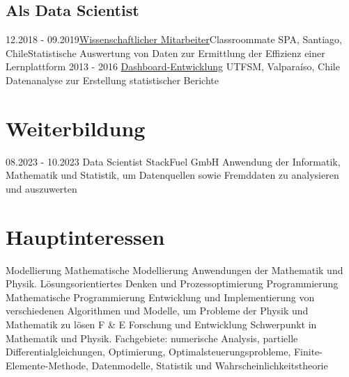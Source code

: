 \documentclass[a4paper]{cv-class}
\begin{document}
\subsection{Als Data Scientist}
\begin{entrylist}
 \entry
{12.2018 - 09.2019}{\href{https://github.com/JuanCaChavaMor/CV/blob/main/Recommendation_Letter_Classroommate.pdf}{Wissenschaftlicher Mitarbeiter}}{Classroommate SPA, Santiago, Chile}{Statistische Auswertung von Daten zur Ermittlung der Effizienz einer Lernplattform}
\entry
    {2013 - 2016}
    {\href{https://github.com/JuanCaChavaMor/CV/blob/main/Recommendation_Letter_UTFSM.pdf}{Dashboard-Entwicklung}}
    {UTFSM, Valparaíso, Chile}
    {Datenanalyse zur Erstellung statistischer Berichte}
\end{entrylist}%
\section{Weiterbildung}
\begin{entrylist}
\entry
{08.2023 - 10.2023}
{Data Scientist}
{StackFuel GmbH}
{Anwendung der Informatik, Mathematik und Statistik, um Datenquellen sowie Fremddaten zu analysieren und auszuwerten}
\end{entrylist}
\newpage
\section{Hauptinteressen}
\begin{entrylist}
\entry
    {Modellierung}
    {Mathematische Modellierung}
    {}
    {Anwendungen der Mathematik und Physik. Lösungsorientiertes Denken und Prozessoptimierung}
\entry
    {Programmierung}
    {\,Mathematische Programmierung}
    {}
    {Entwicklung und Implementierung von verschiedenen Algorithmen und Modelle, um Probleme der Physik und Mathematik zu lösen }
\entry
    {F \& E}
    {Forschung und Entwicklung}
    {}
    {Schwerpunkt in Mathematik und Physik. Fachgebiete: numerische Analysis, partielle Differentialgleichungen, Optimierung, Optimalsteuerungsprobleme, Finite-Elemente-Methode, Datenmodelle, Statistik und Wahrscheinlichkeitstheorie}
\end{entrylist}
\end{document}
